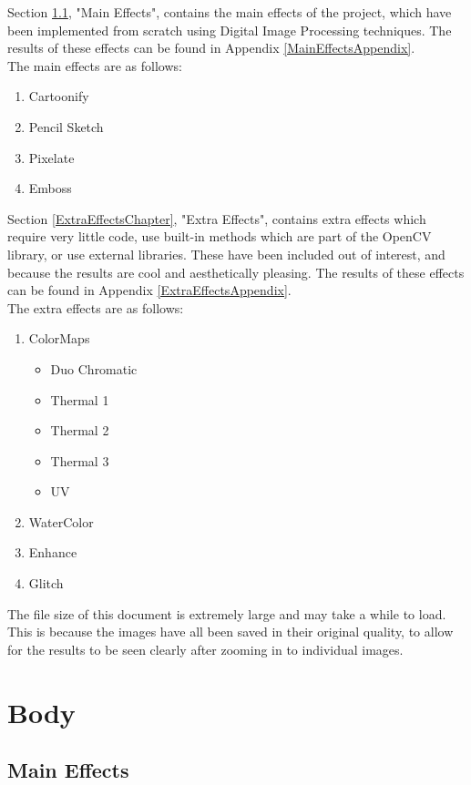 \documentclass[a4paper,10pt]{report}
\begin{document}
	\newpage
	Section \ref{MainEffectsChapter}, "Main Effects", contains the main effects of the project, which have been implemented from scratch using Digital Image Processing techniques. The results of these effects can be found in Appendix \ref{MainEffectsAppendix}. \\
	The main effects are as follows:
	\begin{enumerate}
		\item Cartoonify
		\item Pencil Sketch
		\item Pixelate
		\item Emboss
	\end{enumerate}


	Section \ref{ExtraEffectsChapter}, "Extra Effects", contains extra effects which require very little code, use built-in methods which are part of the OpenCV library, or use external libraries. These have been included out of interest, and because the results are cool and aesthetically pleasing. The results of these effects can be found in Appendix \ref{ExtraEffectsAppendix}.\\
	The extra effects are as follows:
	\begin{enumerate}
		\item ColorMaps
		\begin{itemize}
			\item Duo Chromatic
			\item Thermal 1
			\item Thermal 2
			\item Thermal 3
			\item UV
		\end{itemize}
		\item WaterColor
		\item Enhance
		\item Glitch
	\end{enumerate}

	The file size of this document is extremely large and may take a while to load. This is because the images have all been saved in their original quality, to allow for the results to be seen clearly after zooming in to individual images.


	\chapter{Body}
	
	\section{Main Effects}\label{MainEffectsChapter}
\end{document}
